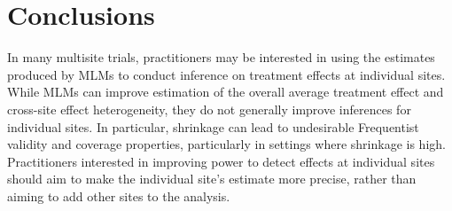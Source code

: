 \documentclass[]{article}
\begin{document}
\section{Conclusions}

In many multisite trials, practitioners may be interested in using the estimates produced by MLMs to conduct inference on treatment effects at individual sites.
While MLMs can improve estimation of the overall average treatment effect and cross-site effect heterogeneity, they do not generally improve inferences for individual sites.
In particular, shrinkage can lead to undesirable Frequentist validity and coverage properties, particularly in settings where shrinkage is high.
Practitioners interested in improving power to detect effects at individual sites should aim to make the individual site's estimate more precise, rather than aiming to add other sites to the analysis.


	
\end{document}

